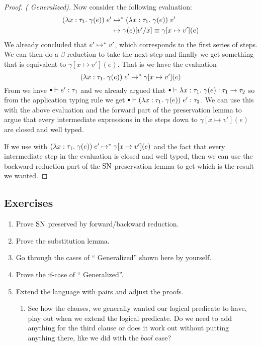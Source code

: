 \begin{proof}[Proof. ( Generalized)]
Now consider the following evaluation:
\begin{align*}
  (\lambda x : \tau_1 . \; \gamma(e)) \; e' & \mapsto^{*} (\lambda x : \tau_1 . \; \gamma(e)) \; v' \\
                                       & \mapsto \gamma(e)[v'/x] \equiv 
                                                   \gamma[x \mapsto v'](e)
\end{align*}
We already concluded that $e' \mapsto^{*} v'$, which corresponds to the first series of steps. We can then do a $\beta$-reduction to take the next step and finally we get something that is equivalent to $\gamma[x \mapsto v'](e)$. That is we have the evaluation
\[
(\lambda x : \tau_1 . \; \gamma(e)) \; e' \mapsto^{*} \gamma[x \mapsto v'](e)
\]
From  we have $\mtenv \vdash e' : \tau_1$ and we already argued that $\mtenv \vdash \tlabs{x}{\tau_1}{\gamma(e)} : \tarrow{\tau_1}{\tau_2}$ so from the application typing rule we get $\mtenv \vdash (\tlabs{x}{\tau_1}{\gamma(e)}) \; e' : \tau_2$. We can use this with the above evaluation and the forward part of the preservation lemma to argue that every intermediate expressions in the steps down to $\gamma[x \mapsto v'](e)$ are closed and well typed.

If we use  with $(\lambda x : \tau_1 . \; \gamma(e)) \; e' \mapsto^{*} \gamma[x \mapsto v'](e)$ and the fact that every intermediate step in the evaluation is closed and well typed, then we can use the backward reduction part of the $\operatorname{SN}$ preservation lemma to get  which is the result we wanted.
\end{proof}
\subsection*{Exercises}
\begin{enumerate}
\item Prove $\operatorname{SN}$ preserved by forward/backward reduction.
\item Prove the substitution lemma.
\item Go through the cases of `` Generalized'' shown here by yourself.
\item Prove the if-case of `` Generalized''.
\item Extend the language with pairs and adjust the proofs. 
  \begin{enumerate}
  \item See how the clauses, we generally wanted our logical predicate to have, play out when we extend the logical predicate. Do we need to add anything for the third clause or does it work out without putting anything there, like we did with the $bool$ case?
  \end{enumerate}
\end{enumerate}
\clearpage

